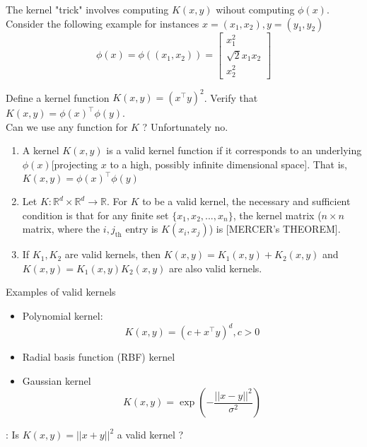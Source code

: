 The kernel "trick" involves computing $K(x,y)$ wihout computing $\phi(x)$. Consider the following example for instances $x = (x_1,x_2), y = (y_1,y_2)$
$$
  \phi(x) = \phi((x_1,x_2)) = \begin{bmatrix}
    x_1^2          \\
    \sqrt{2}x_1x_2 \\
    x_2^2
  \end{bmatrix}
$$

Define a kernel function $K(x,y) = (x^\top y)^2$. Verify that $K(x,y) = \phi(x)^\top \phi(y)$. \\

Can we use any function for $K$ ? Unfortunately no.
\begin{enumerate}
  \item A kernel $K(x,y)$ is a valid kernel function if it corresponds to an underlying $\phi(x)$[projecting $x$ to a high, possibly infinite dimensional space]. That is, $K(x,y) = \phi(x)^\top \phi(y)$
  \item Let $K: \mathbb{R}^d \times \mathbb{R}^d \rightarrow \mathbb{R}$. For $K$ to be a valid kernel, the necessary and sufficient condition is that for any finite set $\{x_1,x_2,...,x_n\}$, the kernel matrix ($n \times n$ matrix, where the $i,j_{\text{th}}$ entry is $K(x_i,x_j)$) is  [MERCER's THEOREM].
  \item If $K_1,K_2$ are valid kernels, then $K(x,y) = K_1(x,y) + K_2(x,y)$ and $K(x,y) = K_1(x,y)K_2(x,y)$ are also valid kernels.
\end{enumerate}

Examples of valid kernels
\begin{itemize}
  \item Polynomial kernel:
        $$
          K(x,y) = (c + x^\top y)^d, c > 0
        $$
  \item Radial basis function (RBF) kernel
  \item Gaussian kernel
        $$
          K(x,y) = \exp(-\frac{||x-y||^2}{\sigma^2})
        $$
\end{itemize}

: Is $K(x,y) = ||x+y||^2$ a valid kernel ?